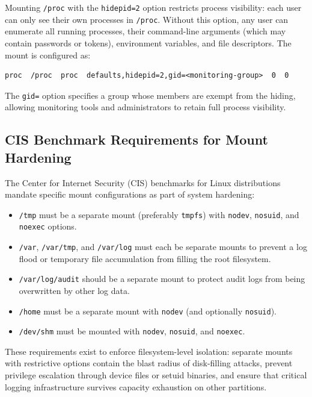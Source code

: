 \begin{securitybox}
Mounting \texttt{/proc} with the \texttt{hidepid=2} option restricts process visibility: each user can only see their own processes in \texttt{/proc}. Without this option, any user can enumerate all running processes, their command-line arguments (which may contain passwords or tokens), environment variables, and file descriptors. The mount is configured as:

\begin{verbatim}
proc  /proc  proc  defaults,hidepid=2,gid=<monitoring-group>  0  0
\end{verbatim}

The \texttt{gid=} option specifies a group whose members are exempt from the hiding, allowing monitoring tools and administrators to retain full process visibility.

\subsection*{CIS Benchmark Requirements for Mount Hardening}

The Center for Internet Security (CIS) benchmarks for Linux distributions mandate specific mount configurations as part of system hardening:

\begin{itemize}
  \item \texttt{/tmp} must be a separate mount (preferably \texttt{tmpfs}) with \texttt{nodev}, \texttt{nosuid}, and \texttt{noexec} options.
  \item \texttt{/var}, \texttt{/var/tmp}, and \texttt{/var/log} must each be separate mounts to prevent a log flood or temporary file accumulation from filling the root filesystem.
  \item \texttt{/var/log/audit} should be a separate mount to protect audit logs from being overwritten by other log data.
  \item \texttt{/home} must be a separate mount with \texttt{nodev} (and optionally \texttt{nosuid}).
  \item \texttt{/dev/shm} must be mounted with \texttt{nodev}, \texttt{nosuid}, and \texttt{noexec}.
\end{itemize}

These requirements exist to enforce filesystem-level isolation: separate mounts with restrictive options contain the blast radius of disk-filling attacks, prevent privilege escalation through device files or setuid binaries, and ensure that critical logging infrastructure survives capacity exhaustion on other partitions.


\end{securitybox}
